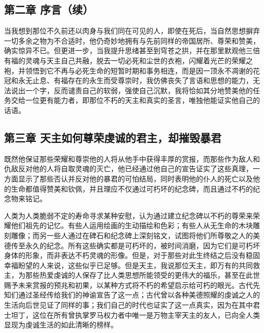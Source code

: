 
\subsection{第二章 序言（续）}

当我想到那位不久前还以肉身与我们同在可见的人，即使在死后，当自然思想摒弃一切多余之物为不合适时，他仍奇妙地拥有与先前同样的帝国居所、尊荣和赞美，确实惊异不已。但更进一步，当我提升思绪甚至到穹苍之拱，并在那里默观他三倍有福的灵魂与天主自己共融，脱去一切必死和尘世的衣袍，闪耀着光芒的荣耀之袍，并领悟到它不再与必死生命的短暂时期和事务相连，而是因一顶永不凋谢的花冠和永无止息、有福存在的永生而受尊崇时，我仿佛丧失了言语和思想的能力，无法说出一个字，反而谴责自己的软弱，强使自己沉默，我将恰如其分地赞美他的任务交给一位更有能力者，即那位不朽的天主和真实的圣言，唯独他能证实他自己的话语。\par


\subsection{第三章 天主如何尊荣虔诚的君主，却摧毁暴君}

既然他保证那些荣耀和尊崇他的人将从他手中获得丰厚的赏报，而那些作为敌人和仇敌反对他的人将自取灵魂的灭亡，他已经通过他自己的宣告证实了这些真理，一方面显示了那些否认并反对他的暴君的可怕结局，同时表明他的仆人的死亡以及他的生命都值得赞美和钦佩，并且理应不仅通过可朽坏的纪念碑，而且通过不朽的纪念物来铭记。\par

人类为人类脆弱不定的寿命寻求某种安慰，认为通过建立纪念碑以不朽的尊荣来荣耀他们祖先的记忆。有些人运用绘画的生动描绘和色彩；有些人从无生命的木块雕刻雕像；而另一些人通过在碑石和纪念碑上深刻铭文，试图将他们所尊敬之人的美德传至永久的纪念。所有这些确实都是可朽坏的，被时间消磨，因为它们是可朽坏身体的形象，而非表达不朽灵魂的形像。但是，对于那些对此生终结之后没有稳固幸福盼望的人来说，这些似乎已足够。但是天主，我说那位天主，即万有的共同救主，为那些热爱虔诚的人保存了比人类思想所能领受的更伟大的福乐，甚至在此世赐予未来赏报的预兆和初果，以某种方式将不朽的希望启示给可朽的眼光。古代先知们通过圣经传给我们的神谕宣告了这一点；古代曾以各种美德照耀的虔诚之人的生活向后世见证了同样的事；我们自己的时代也证实了这一点真实，因为在其中君士坦丁，这位在所有曾执掌罗马权力者中唯一是万物主宰天主的友人，已向全人类显现为虔诚生活的如此清晰的榜样。\par

